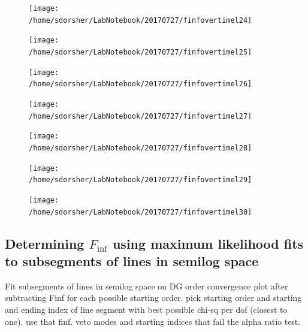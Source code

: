 \documentclass{article}
\begin{document}
\begin{figure}
  \texttt{[image: /home/sdorsher/LabNotebook/20170727/finfovertimel24]}
\end{figure}

\begin{figure}
  \texttt{[image: /home/sdorsher/LabNotebook/20170727/finfovertimel25]}
\end{figure}

\begin{figure}
  \texttt{[image: /home/sdorsher/LabNotebook/20170727/finfovertimel26]}
\end{figure}

\begin{figure}
  \texttt{[image: /home/sdorsher/LabNotebook/20170727/finfovertimel27]}
\end{figure}

\begin{figure}
  \texttt{[image: /home/sdorsher/LabNotebook/20170727/finfovertimel28]}
\end{figure}

\begin{figure}
  \texttt{[image: /home/sdorsher/LabNotebook/20170727/finfovertimel29]}
\end{figure}

\begin{figure}
  \texttt{[image: /home/sdorsher/LabNotebook/20170727/finfovertimel30]}
\end{figure}


\subsection{Determining $F_{\inf}$ using maximum likelihood fits to subsegments of lines in semilog space}
Fit subsegments of lines in semilog space on DG order convergence plot after subtracting Finf for each possible starting order. pick starting order and starting and ending index of line segment with best possible chi-sq per dof (closest to one). use that finf. veto modes and starting indices that fail the alpha ratio test.
\end{document}
